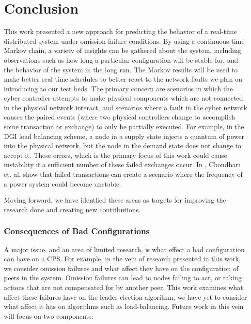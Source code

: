 \chapter{Conclusion}

This work presented a new approach for predicting the behavior of a real-time distributed system under omission failure conditions. By using a continuous time Markov chain, a variety of insights can be gathered about the system, including observations such as how long a particular configuration will be stable for, and the behavior of the system in the long run.  The Markov results will be used  to make better real time schedules to better react to the network faults we plan on introducing to our test beds. The primary concern are scenarios in which the cyber controller attempts to make physical components which are not connected in the physical network interact, and scenarios where a fault in the cyber network causes the paired events (where two physical controllers change to accomplish some transaction or exchange) to only be partially executed. For example, in the DGI load balancing scheme, a node in a supply state injects a quantum of power into the physical network, but the node in the demand state does not change to accept it. These errors, which is the primary focus of this work could cause instability if a sufficient number of these failed exchanges occur. In \cite{HARINI}, Choudhari et. al. show that failed transactions can create a scenario where the frequency of a power system could become unstable. 

Moving forward, we have identfied these areas as targets for improving the research done and creating new contributions.

\subsection{Consequences of Bad Configurations}

A major issue, and an area of limited research, is what effect a bad configuration can have on a CPS. For example, in the vein of research presented in this work, we consider omission failures and what affect they have on the configuration of peers in the system. Omission failures can lead to nodes failing to act, or taking actions that are not compensated for by another peer. This work examines what affect these failures have on the leader election algorithm, we have yet to consider what affect it has on algorithms such as load-balancing. Future work in this vein will focus on two components:

